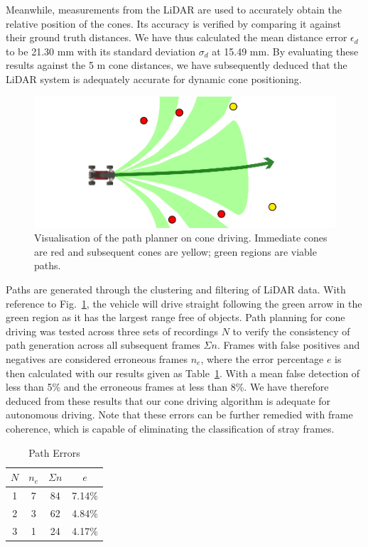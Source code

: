 
Meanwhile, measurements from the LiDAR are used to accurately obtain the relative position of the cones. Its accuracy is verified by comparing it against their ground truth distances. We have thus calculated the mean distance error $\epsilon_d$ to be 21.30 mm with its standard deviation $\sigma_d$ at 15.49 mm. By evaluating these results against the 5 m cone distances, we have subsequently deduced that the LiDAR system is adequately accurate for dynamic cone positioning. 

\begin{figure}[H]
	\centering
	\includegraphics[width=0.9\linewidth]{conedriving}
	\caption[Visualisation of the path planner on cone driving]{Visualisation of the path planner on cone driving. Immediate cones are red and subsequent cones are yellow; green regions are viable paths. }
	\label{fig:7:conedrive}
\end{figure}

Paths are generated through the clustering and filtering of LiDAR data. With reference to Fig.~\ref{fig:7:conedrive}, the vehicle will drive straight following the green arrow in the green region as it has the largest range free of objects. Path planning for cone driving was tested across three sets of recordings $N$ to verify the consistency of path generation across all subsequent frames $\Sigma n$. Frames with false positives and negatives are considered erroneous frames $n_e$, where the error percentage $e$ is then calculated with our results given as Table~\ref{tbl:7:frame}. With a mean false detection of less than 5\% and the erroneous frames at less than 8\%. We have therefore deduced from these results that our cone driving algorithm is adequate for autonomous driving. Note that these errors can be further remedied with frame coherence, which is capable of eliminating the classification of stray frames.

\begin{table}[H]
	\caption{Path Errors}
	\label{tbl:7:frame}
	\centering
	\begin{tabular}{cccc}
		\toprule
		$N$ & $n_e$ & $\Sigma n$ &  $e$   \\ \midrule
		 1  &   7   &     84     & 7.14\% \\
		 2  &   3   &     62     & 4.84\% \\
		 3  &   1   &     24     & 4.17\% \\ \bottomrule
	\end{tabular}
\end{table}

